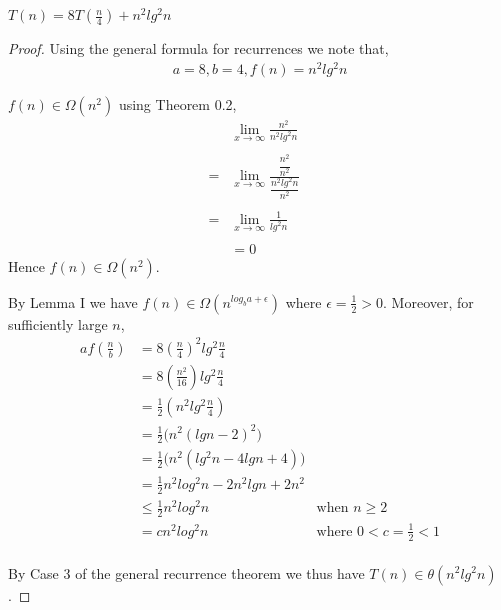 \documentclass[12pt]{article}
\newenvironment{lemma}[2][Lemma]{\begin{trivlist}
\item[\hskip \labelsep {\bfseries #1}\hskip \labelsep {\bfseries #2.}]}{\end{trivlist}}
\newenvironment{question}[2][Question]{\begin{trivlist}
\item[\hskip \labelsep {\bfseries #1}\hskip \labelsep {\bfseries #2.}]}{\end{trivlist}}
\begin{document}
\begin{question}{5 (c)} $T(n) = 8T(\frac{n}{4}) + n^{2}lg^{2}n$
  \begin{proof}
    Using the general formula for recurrences we note that,
    \begin{align*}
      a = 8, b = 4, f(n) = n^{2}lg^{2}n
    \end{align*}

    \begin{lemma}{I} $f(n) \in \Omega(n^{2})$ using Theorem 0.2,
      \begin{align*}
          & \lim_{x\to\infty} \frac{n^{2}}{n^{2}lg^{2}n} &\\ \\
        = & \lim_{x\to\infty} \frac{
          \dfrac{n^{2}}{n^{2}}
        }{
          \dfrac{n^{2}lg^{2}n}{n^{2}}
        } &\\ \\
        = & \lim_{x\to\infty} \frac{
          1
        }{
          lg^{2}n
        }&\\ \\
        & = 0 &
      \end{align*}
      Hence $f(n) \in \Omega(n^{2})$.
    \end{lemma}

    By Lemma I we have $f(n) \in \Omega(n^{log_{b}a + \epsilon})$ where
    $\epsilon = \frac{1}{2} > 0$.
    Moreover, for sufficiently large $n$,
    \begin{align*}
      af(\frac{n}{b}) & = 8(\frac{n}{4})^{2}lg^{2}\frac{n}{4}&\\
                      & = 8(\frac{n^{2}}{16})lg^{2}\frac{n}{4}&\\
                      & = \frac{1}{2}(n^{2}lg^{2}\frac{n}{4})&\\
                      & = \frac{1}{2} \bigl(n^{2}(lgn - 2)^{2}\bigr) &\\
                      & = \frac{1}{2} \bigl(n^{2}(lg^{2}n - 4lgn + 4)\bigr) &\\
                      & = \frac{1}{2}n^{2}log^{2}n - 2n^{2}lgn + 2n^{2}&\\
                      & \leq \frac{1}{2}n^{2}log^{2}n & \text{when $n \geq 2$}\\
                      & = cn^{2}log^{2}n & \text{where $0 < c = \frac{1}{2} < 1$}\\
    \end{align*}

    By Case 3 of the general recurrence theorem we thus have $T(n) \in \theta(n^{2}lg^{2}n)$.
  \end{proof}
\end{question}
\end{document}
